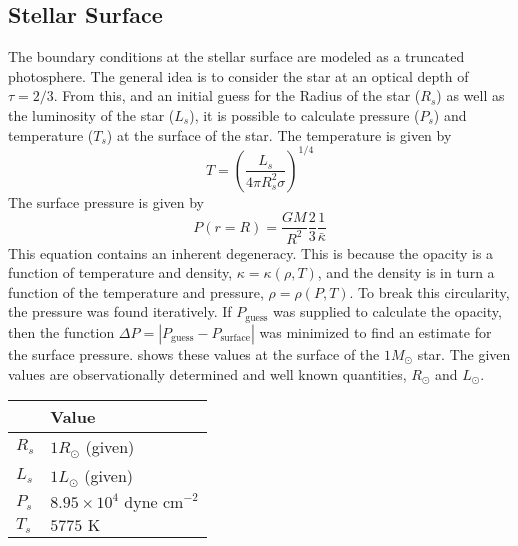 \documentclass[10pt]{article}
\renewcommand{\ll}{\left} %
\newcommand{\rr}{\right} %
\newcommand{\txt}{\textrm} %
\newcommand{\unit}[1]{\txt{ #1}} %
\newcommand{\E}[1]{\times 10^{#1}} %
\begin{document}
\subsection{Stellar Surface}
The boundary conditions at the stellar surface are modeled as a truncated photosphere. The general idea is to consider the star at an optical depth of $\tau = 2/3$. From this, and an initial guess for the Radius of the star ($R_s$) as well as the luminosity of the star ($L_s$), it is possible to calculate pressure ($P_s$) and temperature ($T_s$) at the surface of the star. The temperature is given by
\begin{equation}\label{eqn:surfacet}
T = \left(\frac{L_s}{4\pi R_s^2 \sigma}\right)^{1/4}
\end{equation}
The surface pressure is given by
\begin{equation}
P(r=R) = \frac{GM}{R^2} \frac{2}{3} \frac{1}{\bar{\kappa}}
\end{equation}
This equation contains an inherent degeneracy. This is because the opacity is a function of temperature and density, $\kappa = \kappa(\rho,T)$, and the density is in turn a function of the temperature and pressure, $\rho = \rho(P,T)$. To break this circularity, the pressure was found iteratively. If $P_\txt{guess}$ was supplied to calculate the opacity, then the function $\Delta P = \ll| P_\txt{guess} - P_\txt{surface} \rr|$ was minimized to find an estimate for the surface pressure.  shows these values at the surface of the $1M_\odot$ star. The given values are observationally determined and well known quantities, $R_\odot$ and $L_\odot$.

\begin{table}[htbp]
   \centering
   \begin{tabular}{@{} l|l @{}} 
   & Value \\ \hline \hline
   $R_s$ & $1 R_\odot$ (given)\\
   $L_s$ & $1 L_\odot$ (given) \\
   $P_s$ & $8.95\E{4} \unit{dyne cm}^{-2}$ \\
   $T_s$ & $5775 \unit{K}$
   \end{tabular}
   \label{tab:surface}
\end{table}

\end{document}
